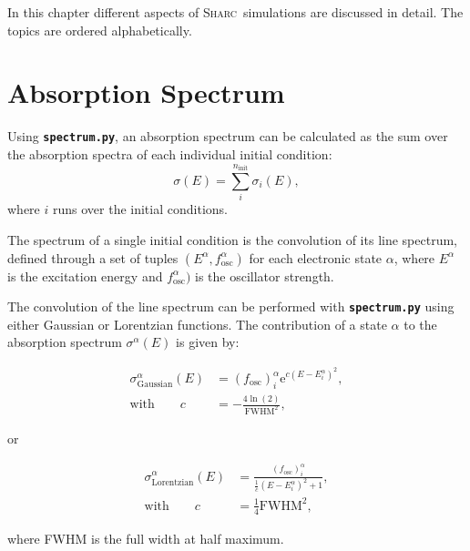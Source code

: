 \documentclass[a4paper,11pt,DIV=15,openany,twoside=false]{scrbook}
\newcommand{\ttmdump}[1]{#1}
\newcommand{\sharc}{\textsc{Sharc}}
\newcommand{\ttt}[1]{\textbf{\texttt{#1}}}
\newcommand{\E}{\ensuremath{\mathrm{e}}}
\begin{document}
In this chapter different aspects of \sharc\ simulations are discussed in detail. The topics are ordered alphabetically.


\section{Absorption Spectrum}\label{met:spectrum}

Using \ttt{spectrum.py}, an absorption spectrum can be calculated as the sum over the absorption spectra of each individual initial condition:
\begin{equation}
  \sigma(E)=\sum\limits_i^{n_\text{init}} \sigma_i(E),
\end{equation}
where $i$ runs over the initial conditions.

The spectrum of a single initial condition is the convolution of its line spectrum, defined through a set of tuples $(E^\alpha,f_\text{osc}^\alpha)$ for each electronic state $\alpha$, where $E^\alpha$ is the excitation energy and $f_\text{osc}^\alpha)$ is the oscillator strength.

The convolution of the line spectrum can be performed with \ttt{spectrum.py} using either Gaussian or Lorentzian functions. The contribution of a state $\alpha$ to the absorption spectrum $\sigma^\alpha(E)$ is given by:
\ttmdump{
  \begin{align}
    \sigma_{\text{Gaussian}}^\alpha(E)&=
    \left(f_{\text{osc}}\right)_i^\alpha 
    \E^{c\left(E-E_i^\alpha\right)^2},\\
    \text{with}\qquad
    c&=-\frac{4\ln(2)}{\text{FWHM}^2},
  \end{align}
}
or
\ttmdump{
  \begin{align}
    \sigma_{\text{Lorentzian}}^\alpha(E)&=
    \frac{\left(f_{\text{osc}}\right)_i^\alpha}{\frac{1}{c}\left(E-E_i^\alpha\right)^2+1},\\
    \text{with}\qquad
    c&=\frac{1}{4}\text{FWHM}^2,
  \end{align}
}
where FWHM is the full width at half maximum.
\end{document}
